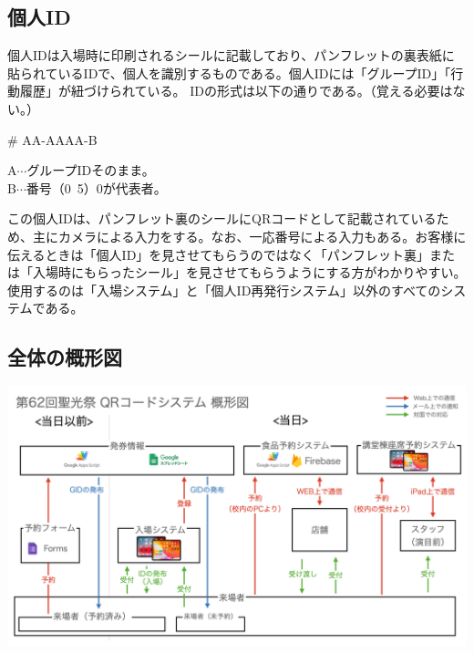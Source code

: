 \documentclass[dvipdfmx,jb5]{jreport}
\begin{document}
\subsection{個人ID}
個人IDは入場時に印刷されるシールに記載しており、パンフレットの裏表紙に貼られているIDで、個人を識別するものである。個人IDには「グループID」「行動履歴」が紐づけられている。
IDの形式は以下の通りである。（覚える必要はない。）
\begin{screen}
      \begin{center}
            {\huge \# AA-AAAA-B}\\
      \end{center}
      A$\cdots$グループIDそのまま。\\
      B$\cdots$番号（0~5）0が代表者。
\end{screen}
この個人IDは、パンフレット裏のシールにQRコードとして記載されているため、主にカメラによる入力をする。なお、一応番号による入力もある。お客様に伝えるときは「個人ID」を見させてもらうのではなく「パンフレット裏」または「入場時にもらったシール」を見させてもらうようにする方がわかりやすい。使用するのは「入場システム」と「個人ID再発行システム」以外のすべてのシステムである。
\subsection{全体の概形図}
\includegraphics[scale=0.15]{assets/qrcode-system-first-look.png}
\end{document}
